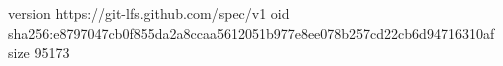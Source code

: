 version https://git-lfs.github.com/spec/v1
oid sha256:e8797047cb0f855da2a8ccaa5612051b977e8ee078b257cd22cb6d94716310af
size 95173
